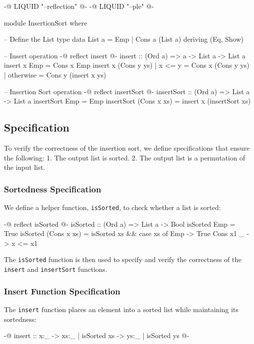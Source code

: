 \documentclass[]{rptuseminar}
\begin{document}
\begin{haskell}
{-@ LIQUID "--reflection" @-}
{-@ LIQUID "--ple" @-}

module InsertionSort where

-- Define the List type
data List a = Emp | Cons a (List a) deriving (Eq, Show)

-- Insert operation
{-@ reflect insert @-}
insert :: (Ord a) => a -> List a -> List a
insert x Emp = Cons x Emp
insert x (Cons y ys)
  | x <= y    = Cons x (Cons y ys)
  | otherwise = Cons y (insert x ys)

-- Insertion Sort operation
{-@ reflect insertSort @-}
insertSort :: (Ord a) => List a -> List a
insertSort Emp = Emp
insertSort (Cons x xs) = insert x (insertSort xs)
\end{haskell}

\subsection{Specification}

To verify the correctness of the insertion sort, we define specifications that ensure the following:
1. The output list is sorted.
2. The output list is a permutation of the input list.

\subsubsection{Sortedness Specification}

We define a helper function, \texttt{isSorted}, to check whether a list is sorted:

\begin{haskell}
{-@ reflect isSorted @-}
isSorted :: (Ord a) => List a -> Bool
isSorted Emp = True
isSorted (Cons x xs) =
  isSorted xs && case xs of
    Emp        -> True
    Cons x1 _  -> x <= x1
\end{haskell}

The \texttt{isSorted} function is then used to specify and verify the correctness of the \texttt{insert} and \texttt{insertSort} functions.

\subsubsection{Insert Function Specification}

The \texttt{insert} function places an element into a sorted list while maintaining its sortedness:

\begin{haskell}
{-@ insert :: x:_ -> {xs:_ | isSorted xs} -> {ys:_ | isSorted ys} @-}
\end{haskell}
\end{document}
